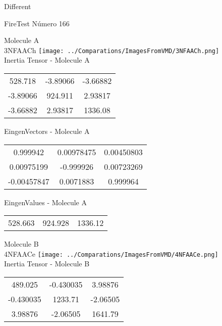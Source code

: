\begin{center}
\vtab
\vtab
\textcolor{NavyBlue}{\Large Different}
\end{center}

 \newpage

\vtab[-2cm]
\begin{center}
{\large FireTest \tab Número 166}
\end{center}
\begin{multicols}{2}
\begin{center}

Molecule A \\ 
3NFAACh
\texttt{[image: ../Comparations/ImagesFromVMD/3NFAACh.png]}
\\
Inertia Tensor - Molecule A \\
\vtab

\begin{tabular}{|c c c|}
528.718	 & 	-3.89066	 & 	-3.66882	 \\
-3.89066	 & 	924.911	 & 	2.93817	 \\
-3.66882	 & 	2.93817	 & 	1336.08
\end{tabular}

\vtab
 EingenVectors - Molecule A     \\
\vtab
\begin{tabular}{|c c c|}
0.999942	 & 	0.00978475	 & 	0.00450803	 \\
0.00975199	 & 	-0.999926	 & 	0.00723269	 \\
-0.00457847	 & 	0.0071883	 & 	0.999964
\end{tabular}

\vtab
 EingenValues - Molecule A     \\
\vtab
\begin{tabular}{|c c c|}
528.663	 & 	924.928	 & 	1336.12	 \\
\end{tabular}
\columnbreak

Molecule B \\ 
4NFAACe
\texttt{[image: ../Comparations/ImagesFromVMD/4NFAACe.png]}
\\
Inertia Tensor - Molecule B \\
\vtab

\begin{tabular}{|c c c|}
489.025	 & 	-0.430035	 & 	3.98876	 \\
-0.430035	 & 	1233.71	 & 	-2.06505	 \\
3.98876	 & 	-2.06505	 & 	1641.79
\end{tabular}


\end{center}
\end{multicols}
